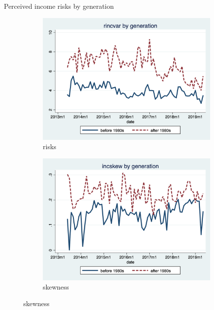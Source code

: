 \documentclass{beamer}
\begin{document}


\begin{frame}{Perceived income risks by generation}
	\begin{figure}[ht]
		\label{ts_incvar_byear_g_mean}
		\begin{subfigure}[b]{0.46\textwidth}
			\centering
			\caption{risks}
			\includegraphics[width=\textwidth, height = 0.33\textheight]{figures/ts_rincvar_byear_g_median.png}
		\end{subfigure}
		\begin{subfigure}[b]{0.46\textwidth}
			\caption{skewness}
			\includegraphics[width=\textwidth, height = 0.33\textheight]{figures/ts_incskew_byear_g_median.png}
		\end{subfigure}
	\end{figure}
\end{frame}
\end{document}
